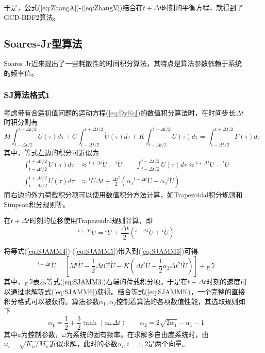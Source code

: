 于是，公式(\ref{eq:ZhangA})-(\ref{eq:ZhangV})结合在$t+\Delta t$时刻的平衡方程，就得到了GCD-BDF2算法。

\subsection{Soares-Jr型算法}
Soares Jr近来提出了一些耗散性的时间积分算法\cite{Jr2014,Soares2014,Grosseholz2015,SoaresJr2016,Soares2015,Soares2016a,SoaresJr2016a}，其特点是算法参数依赖于系统的频率值。
\subsubsection{SJ算法格式1\cite{SoaresJr2016}}
考虑带有合适初值问题的运动方程(\ref{eq:DyEq})的数值积分算法时，在时间步长$\Delta t$时积分则有
\begin{equation}
M\int_{t-\Delta t/2}^{t+\Delta t/2}\ddot{U}(\tau)d\tau+C\int_{t-\Delta t/2}^{t+\Delta t/2}\dot{U}(\tau)d\tau+K\int_{t-\Delta t/2}^{t+\Delta t/2}{U}(\tau)d\tau=\int_{t-\Delta t/2}^{t+\Delta t/2}F(\tau)d\tau\label{eq:SJAMM3}
\end{equation}
其中，等式左边的积分可近似为
\begin{subequations}
\begin{align}
\int_{t-\Delta t/2}^{t+\Delta t/2}\ddot{U}(\tau)d\tau&\approx{^{t+\Delta t}\!\dot{U}}-{^{t}\!\dot{U}}\qquad \int_{t-\Delta t/2}^{t+\Delta t/2}\dot{U}(\tau)d\tau\approx{^{t+\Delta t}\!{U}}-{^{t}\!{U}}\\
\int_{t-\Delta t/2}^{t+\Delta t/2}{U}(\tau)d\tau&\approx{^t\!U}\Delta t+\frac{\Delta t^2}{2}(\alpha_1{^{t+\Delta t}\!\dot{U}}+\alpha_2{^{t}\!\dot{U}})\label{eq:SJAMM43}
\end{align}\label{eq:SJAMM4}
\end{subequations}
而右边的外力荷载积分项可以使用数值积分方法计算，如Trapezoidal积分规则和Simpson积分规则等\cite{Quarteroni2010}。

在$t+\Delta t$时刻的位移使用Trapezoidal规则\cite{book:dover}计算，即
\begin{equation}
{^{t+\Delta t}\!U}={^t\!U}+\frac{\Delta t}{2}({^{t+\Delta t}\!\dot{U}}+{^{t}\!\dot{U}})\label{eq:SJAMM5}
\end{equation}

将等式(\ref{eq:SJAMM4})-(\ref{eq:SJAMM5})带入到(\ref{eq:SJAMM3})可得
\begin{equation}
[M+\frac{1}{2}\Delta tC+\frac{1}{2}\alpha_1\Delta t^2K]{^{t+\Delta t}\!\dot{U}}=[M{^t\!\dot{U}}-\frac{1}{2}\Delta tC{^t\!\dot{U}}-K(\Delta t{^t\!U}+\frac{1}{2}\alpha_2\Delta t^2{^t\!\dot{U}})]+{_{F_i}\!\Im}\label{eq:SJAMM6}
\end{equation}
其中，${_{F_i}\!\Im}$表示等式(\ref{eq:SJAMM3})右端的荷载积分项。于是在$t+\Delta t$时刻的速度可以通过求解等式(\ref{eq:SJAMM6})获得。结合等式(\ref{eq:SJAMM5})，一个完整的直接积分格式可以被获得。算法参数$\alpha_1,\alpha_2$控制着算法的各项数值性能，其选取规则如下
\begin{equation}
\alpha_1=\frac12+\frac{3}{2}\tanh(a\omega\Delta t)\qquad\alpha_2=2\sqrt{2\alpha_1}-\alpha_1-1
\end{equation}
其中$a$为控制参数，$\omega$为系统的固有频率。在求解多自由度系统时，由$\omega_i=\sqrt{K_{ii}/M_{ii}}$近似求解，此时的参数$\alpha_i,i=1,2$是两个向量。

